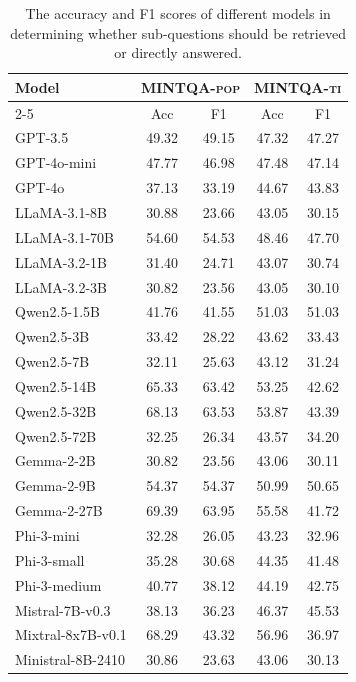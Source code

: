 \begin{table}[!t]
\tiny
\centering
\begin{tabular}{l|cc|cc}
\hline
\multirow{2}{*}{Model} & \multicolumn{2}{c|}{\textsc{MINTQA-pop}} & \multicolumn{2}{c}{\textsc{MINTQA-ti}} \\
\cline{2-5}
& Acc & F1 & Acc & F1 \\
\hline
GPT-3.5 & 49.32 & 49.15 & 47.32 & 47.27 \\
GPT-4o-mini & 47.77 & 46.98 & 47.48 & 47.14 \\
GPT-4o & 37.13 & 33.19 & 44.67 & 43.83 \\
\hline
LLaMA-3.1-8B & 30.88 & 23.66 & 43.05 & 30.15 \\
LLaMA-3.1-70B & 54.60 & 54.53 & 48.46 & 47.70 \\
LLaMA-3.2-1B & 31.40 & 24.71 & 43.07 & 30.74 \\
LLaMA-3.2-3B & 30.82 & 23.56 & 43.05 & 30.10 \\
\hline
Qwen2.5-1.5B & 41.76 & 41.55 & 51.03 & 51.03 \\
Qwen2.5-3B & 33.42 & 28.22 & 43.62 & 33.43 \\
Qwen2.5-7B& 32.11 & 25.63 & 43.12 & 31.24 \\
Qwen2.5-14B & 65.33 & 63.42 & 53.25 & 42.62 \\
Qwen2.5-32B & 68.13 & 63.53 & 53.87 & 43.39 \\
Qwen2.5-72B & 32.25 & 26.34 & 43.57 & 34.20 \\
\hline
Gemma-2-2B & 30.82 & 23.56 & 43.06 & 30.11 \\
Gemma-2-9B & 54.37 & 54.37 & 50.99 & 50.65 \\
Gemma-2-27B & 69.39 & 63.95 & 55.58 & 41.72 \\
\hline
Phi-3-mini & 32.28 & 26.05 & 43.23 & 32.96 \\
Phi-3-small & 35.28 & 30.68 & 44.35 & 41.48 \\
Phi-3-medium & 40.77 & 38.12 & 44.19 & 42.75 \\
\hline
Mistral-7B-v0.3 & 38.13 & 36.23 & 46.37 & 45.53 \\
Mixtral-8x7B-v0.1 & 68.29 & 43.32 & 56.96 & 36.97 \\
Ministral-8B-2410 & 30.86 & 23.63 & 43.06 & 30.13 \\
\hline
\end{tabular}
\caption{The accuracy and F1 scores of different models in determining whether sub-questions should be retrieved or directly answered.}
\label{tab:ex2-part2}
\vspace{-0.3cm}
\end{table}
